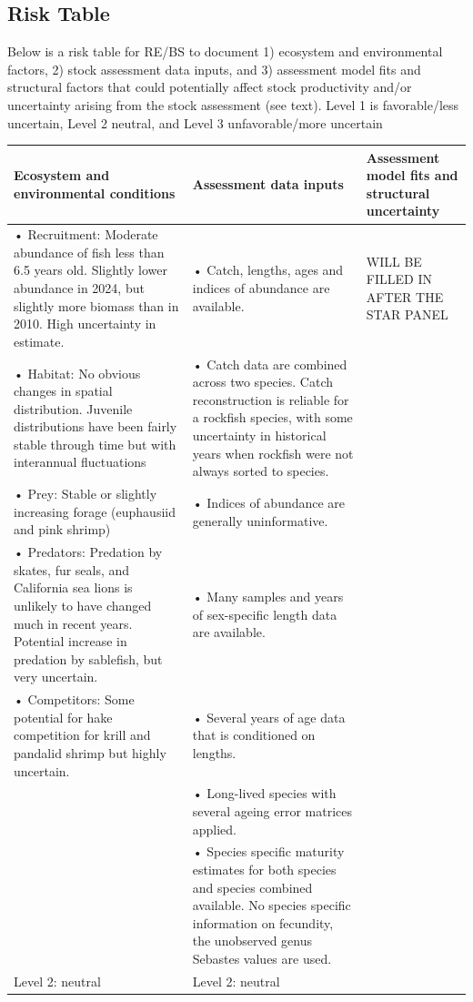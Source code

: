 \documentclass[
]{scrartcl}
\begin{document}
\newpage{}

\subsection{Risk Table}\label{risk-table-1}

Below is a risk table for RE/BS to document 1) ecosystem and
environmental factors, 2) stock assessment data inputs, and 3)
assessment model fits and structural factors that could potentially
affect stock productivity and/or uncertainty arising from the stock
assessment (see text). Level 1 is favorable/less uncertain, Level 2
neutral, and Level 3 unfavorable/more uncertain

\begingroup
\fontsize{9.0pt}{10.8pt}\selectfont
\begin{longtable*}{>{\raggedright\arraybackslash}p{\dimexpr 150.00pt -2\arrayrulewidth}>{\raggedright\arraybackslash}p{\dimexpr 150.00pt -2\arrayrulewidth}>{\raggedright\arraybackslash}p{\dimexpr 150.00pt -2\arrayrulewidth}}
\toprule
Ecosystem and environmental conditions & Assessment data inputs & Assessment model fits and structural uncertainty \\ 
\midrule\addlinespace[2.5pt]
• Recruitment: Moderate abundance of fish less than 6.5 years old.  Slightly lower abundance in 2024, but slightly more biomass than in 2010. High uncertainty in estimate.  & • Catch, lengths, ages and indices of abundance are available. & WILL BE FILLED IN AFTER THE STAR PANEL \\ 
• Habitat: No obvious changes in spatial distribution. Juvenile distributions have been fairly stable through time but with interannual fluctuations & • Catch data are combined across two species. Catch reconstruction is reliable for a rockfish species, with some uncertainty in historical years when rockfish were not always sorted to species. &  \\ 
• Prey:  Stable or slightly increasing forage (euphausiid and pink shrimp)  & • Indices of abundance are generally uninformative. &  \\ 
• Predators: Predation by skates, fur seals, and California sea lions is unlikely to have changed much in recent years. Potential increase in predation by sablefish, but very uncertain. & • Many samples and years of sex-specific length data are available. &  \\ 
• Competitors: Some potential for hake competition for krill and pandalid shrimp but highly uncertain. & • Several years of age data that is conditioned on lengths.  &  \\ 
 & • Long-lived species with several ageing error matrices applied. &  \\ 
 & • Species specific maturity estimates for both species and species combined available. No species specific information on fecundity, the unobserved genus Sebastes values are used. &  \\ 
Level 2: neutral  & Level 2: neutral  &  \\ 
\bottomrule
\end{longtable*}
\endgroup
\end{document}

